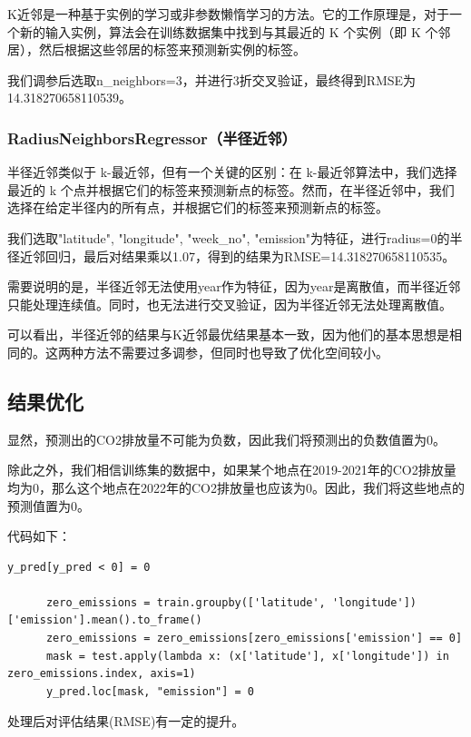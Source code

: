 \documentclass{ctexart}
\begin{document}
K近邻是一种基于实例的学习或非参数懒惰学习的方法。它的工作原理是，对于一个新的输入实例，算法会在训练数据集中找到与其最近的 K 个实例（即 K 个邻居），然后根据这些邻居的标签来预测新实例的标签。

我们调参后选取n\_neighbors=3，并进行3折交叉验证，最终得到RMSE为14.318270658110539。

\subsubsection{RadiusNeighborsRegressor（半径近邻）}

半径近邻类似于 k-最近邻，但有一个关键的区别：在 k-最近邻算法中，我们选择最近的 k 个点并根据它们的标签来预测新点的标签。然而，在半径近邻中，我们选择在给定半径内的所有点，并根据它们的标签来预测新点的标签。

我们选取"latitude", "longitude", "week\_no", "emission"为特征，进行radius=0的半径近邻回归，最后对结果乘以1.07，得到的结果为RMSE=14.318270658110535。

需要说明的是，半径近邻无法使用year作为特征，因为year是离散值，而半径近邻只能处理连续值。同时，也无法进行交叉验证，因为半径近邻无法处理离散值。

可以看出，半径近邻的结果与K近邻最优结果基本一致，因为他们的基本思想是相同的。这两种方法不需要过多调参，但同时也导致了优化空间较小。

\subsection{结果优化}

显然，预测出的CO2排放量不可能为负数，因此我们将预测出的负数值置为0。

除此之外，我们相信训练集的数据中，如果某个地点在2019-2021年的CO2排放量均为0，那么这个地点在2022年的CO2排放量也应该为0。因此，我们将这些地点的预测值置为0。

代码如下：

\begin{lstlisting}[style=Python]
      y_pred[y_pred < 0] = 0
      
      zero_emissions = train.groupby(['latitude', 'longitude'])['emission'].mean().to_frame()
      zero_emissions = zero_emissions[zero_emissions['emission'] == 0]
      mask = test.apply(lambda x: (x['latitude'], x['longitude']) in zero_emissions.index, axis=1)
      y_pred.loc[mask, "emission"] = 0
\end{lstlisting}

处理后对评估结果(RMSE)有一定的提升。
\end{document}
